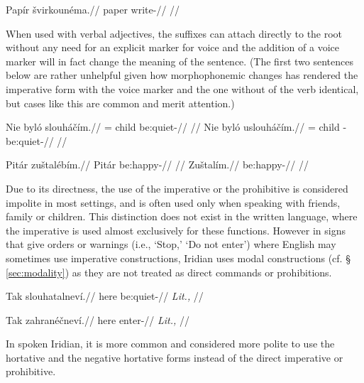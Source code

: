 \pex
\begingl
    \gla Papír švirkounéma.//
    \glb paper write-//
    \glft {}//
\endgl
\xe

When used with verbal adjectives, the suffixes can attach directly to the root without any need for an explicit marker for voice and the addition of a voice marker will in fact change the meaning of the sentence. (The first two sentences below are rather unhelpful given how morphophonemic changes has rendered the imperative form with the voice marker and the one without of the verb  identical, but cases like this are common and merit attention.)

\pex
\a
\begingl
    \gla Nie byló slouháčím.//
    \glb \Pl{}= child be:quiet-//
    \glft {}//
\endgl
\a
\begingl
    \gla Nie byló uslouháčím.//
    \glb \Pl{}= child \Refl{}-be:quiet-//
    \glft {}//
\endgl
\xe

\pex
\a
\begingl
    \gla Pitár zuštalébím.//
    \glb Pitár be:happy-//
    \glft {}//
\endgl
\a
\begingl
    \gla Zuštalím.//
    \glb be:happy-//
    \glft {}//
\endgl
\xe


Due to its directness, the use of the imperative or the prohibitive is
considered impolite in most settings, and is often used only when speaking with
friends, family or children. This distinction does not exist in the written
language, where the imperative is used almost exclusively for these functions.
However in signs that give orders or warnings (i.e., `Stop,' `Do not enter')
where English may sometimes use imperative constructions, Iridian uses modal
constructions (cf. \S\,\ref{sec:modality}) as they are not treated
 as direct commands or prohibitions.

\pex
\begingl
    \gla Tak slouhatalneví.//
    \glb here be:quiet-//
    \glft {} \textit{Lit.,} //
\endgl
\xe

\pex
\begingl
    \gla Tak zahranéčneví.//
    \glb here enter-//
    \glft {} \textit{Lit.,} //
\endgl
\xe

In spoken Iridian, it is more common and considered more polite to use the
hortative and the negative hortative forms instead of the direct imperative
or prohibitive.

